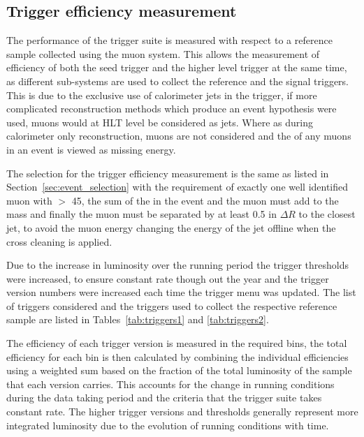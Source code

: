 \subsection{Trigger efficiency measurement} %
\label{sub:trigger_efficiency_measurement}

The performance of the \alt trigger suite is measured with respect to a 
reference sample collected using the muon system. This allows the measurement 
of efficiency of both the \Lone seed trigger and the higher level trigger at 
the same time, as different sub-systems are used to collect the reference and 
the signal triggers. This is due to the exclusive use of calorimeter jets in 
the \alt trigger, if more complicated reconstruction methods which produce an 
event hypothesis were used, muons would at HLT level be considered as 
jets. Where as during calorimeter only reconstruction, muons are not considered 
and the \pt of any muons in an event is viewed as missing energy.

The selection for the trigger efficiency measurement is the same as listed in 
Section~\ref{sec:event_selection} with the requirement of exactly one well 
identified muon with \PT $>$ \unit{45}{\GeV}, the sum of the \MET in the event 
and the muon must add to the \PW mass and finally the muon must be separated by 
at least 0.5 in $\Delta R$ to the closest jet, to avoid the muon energy 
changing the energy of the jet offline when the cross cleaning is applied.

Due to the increase in luminosity over the running period the trigger 
thresholds were increased, to ensure constant rate though out the year and the 
trigger version numbers were increased each time the trigger menu was updated.
The list of triggers considered and the triggers used to collect the respective 
reference sample are listed in Tables~\ref{tab:triggers1} and 
\ref{tab:triggers2}.

The efficiency of each trigger version is measured in the required \HT bins, 
the total efficiency for each \HT bin is then calculated by combining the 
individual efficiencies using a weighted sum based on the fraction of 
the total luminosity of the sample that each version carries. This accounts for 
the change in running conditions during the data taking period and the criteria 
that the trigger suite takes constant rate. The higher trigger versions and 
thresholds generally represent more integrated luminosity due to the evolution 
of running conditions with time.

